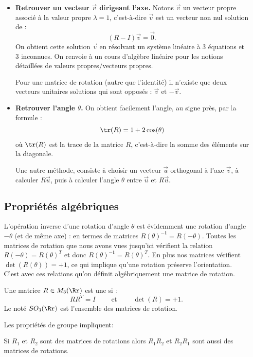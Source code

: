 \documentclass[11pt,class=report,crop=false]{standalone}
\begin{document}
\begin{itemize}
  \item \textbf{Retrouver un vecteur $\vec v$ dirigeant l'axe.}
  Notons $\vec v$ un vecteur propre associé à la valeur propre $\lambda = 1$, c'est-à-dire $\vec v$ est un vecteur non nul solution de :
  $$ (R-I) \vec v = \vec 0.$$
  On obtient cette solution $\vec v$ en résolvant un système linéaire à $3$ équations et $3$ inconnues. On renvoie à un cours d'algèbre linéaire pour les notions détaillées de valeurs propres/vecteurs propres.

  Pour une matrice de rotation (autre que l'identité) il n'existe que deux vecteurs unitaires solutions qui sont opposés : $\vec v$ et $-\vec v$.

  \item \textbf{Retrouver l'angle $\theta$.}
  On obtient facilement l'angle, au signe près, par la formule :
  $$\tr(R) = 1 + 2\cos(\theta)$$
  où $\tr(R)$ est la trace de la matrice $R$, c'est-à-dire la somme des éléments sur la diagonale.

  Une autre méthode, consiste à choisir un vecteur $\vec u$ orthogonal à l'axe $\vec v$, à calculer $R\vec u$, puis à calculer l'angle $\theta$ entre $\vec u$ et  
  $R\vec u$.
\end{itemize}


\subsection{Propriétés algébriques}

L'opération inverse d'une rotation d'angle $\theta$ est évidemment une rotation d'angle $-\theta$ (et de même axe) : en termes de matrices $R(\theta)^{-1} = R(-\theta)$.
Toutes les matrices de rotation que nous avons vues jusqu'ici vérifient la relation $R(-\theta) = R(\theta)^T$ et donc $R(\theta)^{-1} = R(\theta)^T$. En plus nos matrices vérifient $\det(R(\theta)) = +1$, ce qui implique qu'une rotation préserve l'orientation. C'est avec ces relations qu'on définit algébriquement une matrice de rotation.

\begin{definition}
Une matrice $R \in M_3(\Rr)$ est une  si :
$$R R^T = I \qquad \text{ et } \qquad \det(R) = +1.$$
Le  noté $SO_3(\Rr)$ est l'ensemble des matrices de rotation.
\end{definition}

Les propriétés de groupe impliquent: 
\begin{proposition}
Si $R_1$ et $R_2$ sont des matrices de rotations alors $R_1R_2$ et $R_2R_1$ sont aussi des matrices de rotations.
\end{proposition}
\end{document}
